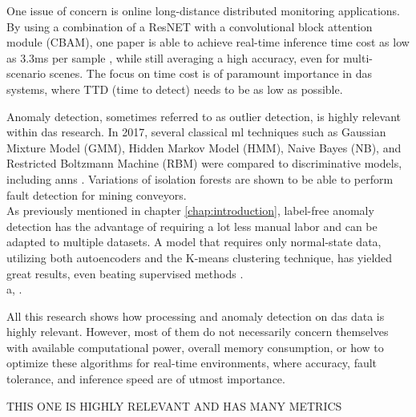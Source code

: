 One issue of concern is online long-distance distributed monitoring applications. By using a combination of a ResNET with a convolutional block attention module (CBAM), one paper is able to achieve real-time inference time cost as low as 3.3ms per sample \cite{photonics9100677}, while still averaging a high accuracy, even for multi-scenario scenes. The focus on time cost is of paramount importance in \acrshort{das} systems, where TTD (time to detect) needs to be as low as possible.




Anomaly detection, sometimes referred to as outlier detection, is highly relevant within \acrshort{das} research. In 2017, several classical \acrshort{ml} techniques such as Gaussian Mixture Model (GMM), Hidden Markov Model (HMM), Naive Bayes (NB), and Restricted Boltzmann Machine (RBM) were compared to discriminative models, including \acrshort{ann}s \cite{app7080841}. Variations of isolation forests are shown to be able to perform fault detection for mining conveyors\cite{WIJAYA2022110330}. \\

As previously mentioned in chapter \ref{chap:introduction}, label-free anomaly detection has the advantage of requiring a lot less manual labor and can be adapted to multiple datasets. A model that requires only normal-state data, utilizing both autoencoders and the K-means clustering technique, has yielded great results, even beating supervised methods \cite{s23084094}. \\ 

a, \cite{10.14778/3538598.3538602} \cite{10.1145/3444690}.

All this research shows how processing and anomaly detection on \acrshort{das} data is highly relevant. However, most of them do not necessarily concern themselves with available computational power, overall memory consumption, or how to optimize these algorithms for real-time environments, where accuracy, fault tolerance, and inference speed are of utmost importance.



THIS ONE IS HIGHLY RELEVANT AND HAS MANY METRICS \cite{s23021009}